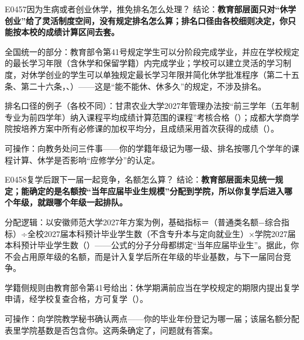 \begin{qa}{E0457}{因为生病或者创业休学，推免排名怎么处理？}
结论：\textbf{教育部层面只对“休学创业”给了灵活制度空间，没有规定排名怎么算；排名口径由各校细则决定，你只能按本校的成绩计算区间去套。}

全国统一的部分：教育部令第41号规定学生可以分阶段完成学业，并应在学校规定的最长学习年限（含休学和保留学籍）内完成学业；学校可以建立灵活的学习制度，对休学创业的学生可以单独规定最长学习年限并简化休学批准程序（第二十五条、第二十六条，、）——这是“能不能休、休多久”的规定，不涉及排名。

排名口径的例子（各校不同）：甘肃农业大学2027年管理办法按“前三学年（五年制专业为前四学年）纳入课程平均成绩计算范围的课程”考核合格（）；成都大学商学院按培养方案中所有必修课的加权平均分，且成绩采用首次获得的成绩（）。

可操作：向教务处问三件事——你的学籍年级记为哪一级、排名按哪几个学年的课程计算、休学是否影响“应修学分”的认定。
\end{qa}

\begin{qa}{E0458}{复学后跟下一届一起竞争，名额怎么算？}
结论：\textbf{教育部层面未见统一规定；能确定的是名额按“当年应届毕业生规模”分配到学院，所以你复学后进入哪个年级，就跟哪个年级一起排队。}

分配逻辑：以安徽师范大学2027年方案为例，基础指标＝（普通类名额−综合指标）÷全校2027届本科预计毕业学生数（不含专升本与定向就业生）×学院2027届本科预计毕业学生数（）——公式的分子分母都绑定“当年应届毕业生”。据此，你不会占用原年级的名额，而是计入复学后所在年级的毕业基数，与下一届同台竞争。

学籍侧规则由教育部令第41号给出：休学期满前应当在学校规定的期限内提出复学申请，经学校复查合格，方可复学（）。

可操作：向学院教学秘书确认两点——你的毕业年份登记为哪一届；该届名额分配表里学院基数是否包含你。这两条确定了，问题就有答案。
\end{qa}

